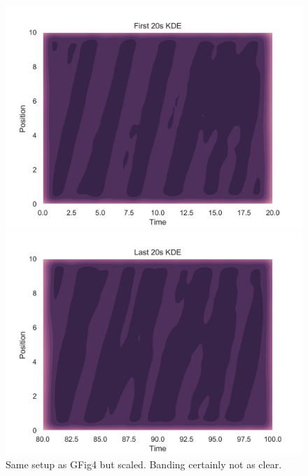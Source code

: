 \documentclass[11pt,a4paper, final, dvipsnames]{article}
\begin{document}
\begin{figure}
    \begin{minipage}[b]{0.49\textwidth}
        \centering
        \includegraphics[width=\textwidth]{Figure4bscaled}
    \end{minipage} %
    \begin{minipage}[b]{0.49\textwidth}
        \centering                    
        \includegraphics[width=\textwidth]{Figure4dscaled}
    \end{minipage}
\caption{Same setup as GFig4 but scaled. Banding certainly not as clear.}
\end{figure}
\end{document}
